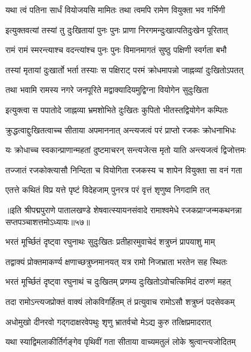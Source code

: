 \twolineshloka
{यथा त्वं पतिना सार्धं वियोजयसि मामितः}
{तथा त्वमपि रामेण वियुक्ता भव गर्भिणी}%

\twolineshloka
{इत्युक्तवत्यां तस्यां तु दुःखितायां पुनः पुनः}
{प्राणा निरगमन्दुःखात्पतिदुःखेन पूरितात्}%

\twolineshloka
{रामं रामं स्मरन्त्याश्च वदन्त्यांश्च पुनः पुनः}
{विमानमागतं सुष्ठु पक्षिणी स्वर्गता बभौ}%

\twolineshloka
{तस्यां मृतायां दुःखार्तो भर्ता तस्याः स पक्षिराट्}
{परमं क्रोधमापन्नो जाह्नव्यां दुःखितोऽपतत्}%

\twolineshloka
{तथा भवामि रामस्य नगरे जनपूरिते}
{मद्वाक्यादियमुद्विग्ना वियोगेन सुदुःखिता}%

\twolineshloka
{इत्युक्त्वा स पपातोदे जाह्नव्या भ्रमशोभिते}
{दुःखितः कुपितो भीतस्तद्वियोगेन कम्पितः}%

\twolineshloka
{क्रुद्धत्वाद्दुःखितत्वाच्च सीताया अपमाननात्}
{अन्त्यजत्वं परं प्राप्तो रजकः क्रोधनाभिधः}%

\twolineshloka
{यः क्रोधाच्च स्वकान्प्राणान्महतां दुष्टमाचरन्}
{सन्त्यजेत्स मृतो याति अन्त्यजत्वं द्विजोत्तमः}%

\twolineshloka
{तज्जातं रजकोक्त्यासौ निन्दिता च वियोगिता}
{रजकस्य च शापेन वियुक्ता सा वनं गता}%

\twolineshloka
{एतत्ते कथितं विप्र यत्ते पृष्टं विदेहजाम्}
{पुनरत्र परं वृत्तं शृणुष्व निगदामि तत्}%


{॥इति श्रीपद्मपुराणे पातालखण्डे शेषवात्स्यायनसंवादे रामाश्वमेधे रजकप्राग्जन्मकथनन्ना सप्तपञ्चाशत्तमोऽध्यायः॥५७॥}



\twolineshloka
{भरतं मूर्च्छितं दृष्ट्वा रघुनाथः सुदुःखितः}
{प्रतीहारमुवाचेदं शत्रुघ्नं प्रापयाशु माम्}%

\twolineshloka
{तद्वाक्यं प्रोक्तमाकर्ण्य क्षणाच्छत्रुघ्नमानयत्}
{यत्र रामो निजभ्राता भरतेन सह स्थितः}%

\twolineshloka
{भरतं मूर्च्छितं दृष्ट्वा रघुनाथं च दुःखितम्}
{प्रणम्य दुःखितोऽवोचत्किमिदं दारुणं महत्}%

\twolineshloka
{तदा रामोऽन्त्यजप्रोक्तं वाक्यं लोकविगर्हितम्}
{तं प्रत्युवाच रामोऽसौ शत्रुघ्नं पदसेवकम्}%

\twolineshloka
{अधोमुखो दीनरवो गद्गदाक्षरवेपथुः}
{शृणु भ्रातर्वचो मेऽद्य कुरु तत्क्षिप्रमादरात्}%

\twolineshloka
{यथा स्याद्विमलाकीर्तिर्गङ्गेव पृथिवीं गता}
{सीताया वाच्यमतुलं लोके श्रुत्वान्त्यजोदितम्}%

